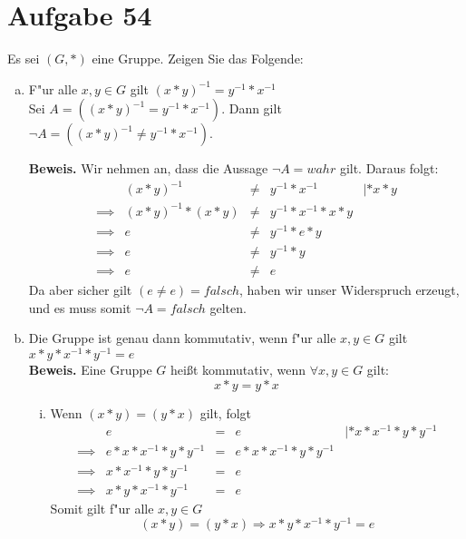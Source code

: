 \section{Aufgabe 54}

Es sei $(G, *)$ eine Gruppe. Zeigen Sie das Folgende:
\begin{enumerate}[(a)]
    \item F"ur alle $x, y \in G$ gilt $(x * y)^{-1} = y^{-1} * x^{-1}$ \\[5pt]
        Sei $A = ((x * y)^{-1} = y^{-1} * x^{-1})$. Dann gilt $\lnot A = ((x * y)^{-1} \neq y^{-1} * x^{-1})$.

        \textbf{Beweis.} Wir nehmen an, dass die Aussage $\lnot A = wahr$ gilt.
        Daraus folgt:
        \begin{equation*}
            \begin{array}{rrcll}
                        &(x * y)^{-1} &\neq& y^{-1} * x^{-1} &| * x * y \\[5pt]
                \implies&(x * y)^{-1} * (x * y) &\neq& y^{-1} * x^{-1} * x * y \\[5pt]
                \implies&e &\neq& y^{-1} * e * y \\[5pt]
                \implies&e &\neq& y^{-1} * y \\[5pt]
                \implies&e &\neq& e
            \end{array}
        \end{equation*}
        Da aber sicher gilt $(e \neq e) = falsch$, haben wir unser Widerspruch
        erzeugt, und es muss somit $\lnot A = falsch$ gelten.
    \item Die Gruppe ist genau dann kommutativ, wenn f"ur alle $x, y \in G$
        gilt $x * y * x^{-1} * y^{-1} = e$ \\[5pt]
        \textbf{Beweis.}
        Eine Gruppe $G$ hei{\ss}t kommutativ, wenn $\forall x, y \in G$ gilt:
            \begin{equation*}
                x * y = y * x
            \end{equation*}
        \begin{enumerate}[i)]
            \item Wenn $(x * y) = (y * x)$ gilt, folgt
                \begin{equation*}
                    \begin{array}{rrcll}
                                 &e &=& e &| * x * x^{-1} * y * y^{-1}\\[5pt]
                        \implies &e * x * x^{-1} * y * y^{-1} &=& e * x * x^{-1} * y * y^{-1} & \\[5pt]
                        \implies &x * x^{-1} * y * y^{-1} &=& e \\[5pt]
                        \implies &x * y * x^{-1} * y^{-1} &=& e
                    \end{array}
                \end{equation*}
                Somit gilt f"ur alle $x, y \in G$
                $$(x * y) = (y * x) \Rightarrow x * y * x^{-1} * y^{-1} = e$$


\end{enumerate}
\end{enumerate}
